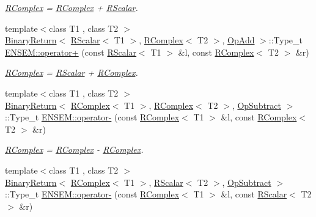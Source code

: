 \begin{DoxyCompactItemize}
\begin{DoxyCompactList}\small\item\em \mbox{\hyperlink{classENSEM_1_1RComplex}{R\+Complex}} = \mbox{\hyperlink{classENSEM_1_1RComplex}{R\+Complex}} + \mbox{\hyperlink{classENSEM_1_1RScalar}{R\+Scalar}}. \end{DoxyCompactList}\item 
{\footnotesize template$<$class T1 , class T2 $>$ }\\\mbox{\hyperlink{structENSEM_1_1BinaryReturn}{Binary\+Return}}$<$ \mbox{\hyperlink{classENSEM_1_1RScalar}{R\+Scalar}}$<$ T1 $>$, \mbox{\hyperlink{classENSEM_1_1RComplex}{R\+Complex}}$<$ T2 $>$, \mbox{\hyperlink{structENSEM_1_1OpAdd}{Op\+Add}} $>$\+::Type\+\_\+t \mbox{\hyperlink{group__rcomplex_gad42347a2cdf1648efaec65d4b0f51651}{E\+N\+S\+E\+M\+::operator+}} (const \mbox{\hyperlink{classENSEM_1_1RScalar}{R\+Scalar}}$<$ T1 $>$ \&l, const \mbox{\hyperlink{classENSEM_1_1RComplex}{R\+Complex}}$<$ T2 $>$ \&r)
\begin{DoxyCompactList}\small\item\em \mbox{\hyperlink{classENSEM_1_1RComplex}{R\+Complex}} = \mbox{\hyperlink{classENSEM_1_1RScalar}{R\+Scalar}} + \mbox{\hyperlink{classENSEM_1_1RComplex}{R\+Complex}}. \end{DoxyCompactList}\item 
{\footnotesize template$<$class T1 , class T2 $>$ }\\\mbox{\hyperlink{structENSEM_1_1BinaryReturn}{Binary\+Return}}$<$ \mbox{\hyperlink{classENSEM_1_1RComplex}{R\+Complex}}$<$ T1 $>$, \mbox{\hyperlink{classENSEM_1_1RComplex}{R\+Complex}}$<$ T2 $>$, \mbox{\hyperlink{structENSEM_1_1OpSubtract}{Op\+Subtract}} $>$\+::Type\+\_\+t \mbox{\hyperlink{group__rcomplex_ga49dbda9bd7d00d928595979502979d9b}{E\+N\+S\+E\+M\+::operator-\/}} (const \mbox{\hyperlink{classENSEM_1_1RComplex}{R\+Complex}}$<$ T1 $>$ \&l, const \mbox{\hyperlink{classENSEM_1_1RComplex}{R\+Complex}}$<$ T2 $>$ \&r)
\begin{DoxyCompactList}\small\item\em \mbox{\hyperlink{classENSEM_1_1RComplex}{R\+Complex}} = \mbox{\hyperlink{classENSEM_1_1RComplex}{R\+Complex}} -\/ \mbox{\hyperlink{classENSEM_1_1RComplex}{R\+Complex}}. \end{DoxyCompactList}\item 
{\footnotesize template$<$class T1 , class T2 $>$ }\\\mbox{\hyperlink{structENSEM_1_1BinaryReturn}{Binary\+Return}}$<$ \mbox{\hyperlink{classENSEM_1_1RComplex}{R\+Complex}}$<$ T1 $>$, \mbox{\hyperlink{classENSEM_1_1RScalar}{R\+Scalar}}$<$ T2 $>$, \mbox{\hyperlink{structENSEM_1_1OpSubtract}{Op\+Subtract}} $>$\+::Type\+\_\+t \mbox{\hyperlink{group__rcomplex_ga9ea00fde5e26657fc53ca42c40fa6618}{E\+N\+S\+E\+M\+::operator-\/}} (const \mbox{\hyperlink{classENSEM_1_1RComplex}{R\+Complex}}$<$ T1 $>$ \&l, const \mbox{\hyperlink{classENSEM_1_1RScalar}{R\+Scalar}}$<$ T2 $>$ \&r)

\end{DoxyCompactItemize}
